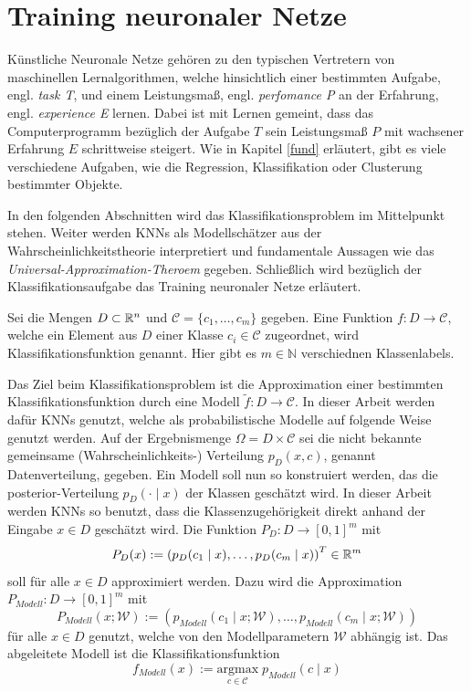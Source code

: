 \section{Training neuronaler Netze}
\label{task_training}
Künstliche Neuronale Netze gehören zu den typischen Vertretern von maschinellen Lernalgorithmen, welche hinsichtlich einer bestimmten Aufgabe, engl. \textit{task T}, und einem Leistungsmaß, engl. \textit{perfomance P} an der Erfahrung, engl. \textit{experience E} lernen\cite{Goodfellow-et-al-2016}. Dabei ist mit Lernen gemeint, dass das Computerprogramm bezüglich der Aufgabe $T$ sein Leistungsmaß $P$ mit wachsener Erfahrung $E$ schrittweise steigert. Wie in Kapitel \ref{fund} erläutert, gibt es viele verschiedene Aufgaben, wie die Regression, Klassifikation oder Clusterung bestimmter Objekte. 

In den folgenden Abschnitten wird das Klassifikationsproblem im Mittelpunkt stehen. Weiter werden KNNs als Modellschätzer aus der Wahrscheinlichkeitstheorie interpretiert und fundamentale Aussagen wie das \textit{Universal-Approximation-Theroem}\cite{HORNIK1989359} gegeben. Schließlich wird bezüglich der Klassifikationsaufgabe das Training neuronaler Netze erläutert.

\begin{defi}
    Sei die Mengen $D \subset \mathbb{R}^n$ und $\mathcal{C}=\{c_1, \ldots, c_m\}$ gegeben. Eine Funktion $f: D \rightarrow \mathcal{C}$, welche ein Element aus $D$ einer Klasse $c_i \in \mathcal{C}$ zugeordnet, wird Klassifikationsfunktion genannt. Hier gibt es $m \in \mathbb{N}$ verschiednen Klassenlabels.
\end{defi}

Das Ziel beim Klassifikationsproblem ist die Approximation einer bestimmten Klassifikationsfunktion durch eine Modell $\tilde{f}: D \rightarrow \mathcal{C}$. In dieser Arbeit werden dafür KNNs genutzt, welche als probabilistische Modelle auf folgende Weise genutzt werden. Auf der Ergebnismenge $\Omega= D \times \mathcal{C}$ sei die nicht bekannte gemeinsame (Wahrscheinlichkeits-) Verteilung $p_{D}(x,c)$, genannt Datenverteilung, gegeben. Ein Modell soll nun so konstruiert werden, das die posterior-Verteilung $p_D(\cdot \; | \; x)$ der Klassen  geschätzt wird. In dieser Arbeit werden KNNs so benutzt, dass die Klassenzugehörigkeit direkt anhand der Eingabe $x \in D$ geschätzt wird. Die Funktion $P_D: D \rightarrow [0,1]^m$ mit
\begin{equation}
    P_D(x):=\left(p_D(c_1 \; | \; x), \ldots, p_D(c_m \; | \; x)\right)^T \in \mathbb{R}^m
\end{equation} soll für alle $x \in D$ approximiert werden. Dazu wird die Approximation $P_{Modell}: D \rightarrow [0,1]^m$ mit 
\begin{equation}
    P_{Modell}(x;\mathcal{W}):=\left(p_{Modell}(c_1 \; | \; x; \mathcal{W}), \ldots, p_{Modell}(c_m \; | \; x; \mathcal{W})\right)
\end{equation}
 für alle $x \in D$ genutzt, welche von den Modellparametern $\mathcal{W}$ abhängig ist. Das abgeleitete Modell ist die Klassifikationsfunktion
\begin{equation}
    f_{Modell}(x):= \underset{c \in \mathcal{C}}{\mathrm{argmax}} \; p_{Modell}(c \; | \; x)
\end{equation}

